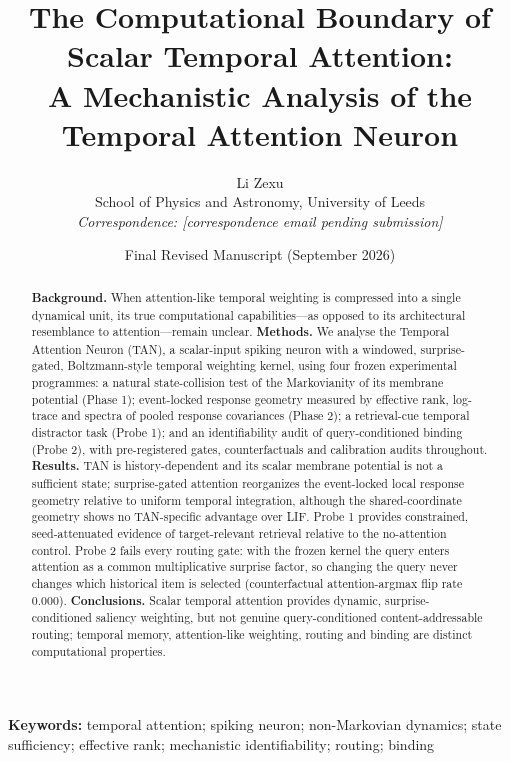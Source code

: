 \documentclass[11pt]{article}
\title{\bf The Computational Boundary of Scalar Temporal Attention:\\
A Mechanistic Analysis of the Temporal Attention Neuron}
\author{Li Zexu\\
School of Physics and Astronomy, University of Leeds\\
\textit{Correspondence: [correspondence email pending submission]}}
\date{Final Revised Manuscript (September 2026)}
\begin{document}
\maketitle

\begin{abstract}
\noindent\textbf{Background.} When attention-like temporal weighting is
compressed into a single dynamical unit, its true computational
capabilities---as opposed to its architectural resemblance to
attention---remain unclear. \textbf{Methods.} We analyse the Temporal
Attention Neuron (TAN), a scalar-input spiking neuron with a windowed,
surprise-gated, Boltzmann-style temporal weighting kernel, using four
frozen experimental programmes: a natural state-collision test of the
Markovianity of its membrane potential (Phase 1); event-locked response
geometry measured by effective rank, log-trace and spectra of pooled
response covariances (Phase 2); a retrieval-cue temporal distractor task
(Probe 1); and an identifiability audit of query-conditioned binding
(Probe 2), with pre-registered gates, counterfactuals and calibration
audits throughout. \textbf{Results.} TAN is history-dependent and its
scalar membrane potential is not a sufficient state; surprise-gated
attention reorganizes the event-locked local response geometry relative
to uniform temporal integration, although the shared-coordinate geometry
shows no TAN-specific advantage over LIF.  Probe 1 provides constrained,
seed-attenuated evidence of target-relevant retrieval relative to the
no-attention control.  Probe 2 fails every routing gate: with the frozen
kernel the query enters attention as a common multiplicative surprise
factor, so changing the query never changes which historical item is
selected (counterfactual attention-argmax flip rate 0.000).
\textbf{Conclusions.} Scalar temporal attention provides dynamic,
surprise-conditioned saliency weighting, but not genuine
query-conditioned content-addressable routing; temporal memory,
attention-like weighting, routing and binding are distinct computational
properties.
\end{abstract}

\noindent\textbf{Keywords:} temporal attention; spiking neuron;
non-Markovian dynamics; state sufficiency; effective rank; mechanistic
identifiability; routing; binding









\end{document}
